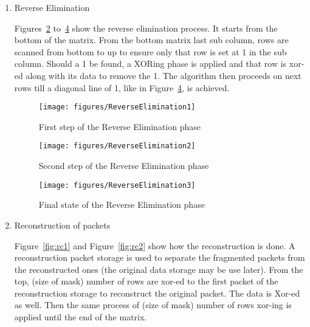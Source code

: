 \documentclass[a4paper,twoside]{article}
\begin{document}
\begin{enumerate}
These Swap phase and the XORing phase are repeated for each row from top to bottom until a triangle of 1 is achieved in Figure~\ref{fig:fs3}.

\begin{figure}[!hbt]
\centering
\texttt{[image: figures/ForwardSubstitution3]}
\caption{Final state of Forward Substitution phase}
\label{fig:fs3}
\end{figure}

\item Reverse Elimination

Figures~\ref{fig:re1} to~\ref{fig:re3} show the reverse elimination process. It starts from the bottom of the matrix. From the bottom matrix last sub column, rows are scanned from bottom to up to ensure only that row is set at 1 in the sub column. Should a 1 be found, a XORing phase is applied and that row is xor-ed along with its data to remove the 1. The algorithm then proceeds on next rows till a diagonal line of 1, like in Figure~\ref{fig:re3}, is achieved.

\begin{figure}[!hbt]
\centering
\texttt{[image: figures/ReverseElimination1]}
\caption{First step of the Reverse Elimination phase}
\label{fig:re1}
\end{figure}

\begin{figure}[!hbt]
\centering
\texttt{[image: figures/ReverseElimination2]}
\caption{Second step of the Reverse Elimination phase}
\label{fig:re2}
\end{figure}

\begin{figure}[!hbt]
\centering
\texttt{[image: figures/ReverseElimination3]}
\caption{Final state of the Reverse Elimination phase}
\label{fig:re3}
\end{figure}

\newpage

\item Reconstruction of packets

Figure~\ref{fig:rc1} and Figure~\ref{fig:rc2} show how the reconstruction is done. A reconstruction packet storage is used to separate the fragmented packets from the reconstructed ones (the original data storage may be use later). From the top, (size of mask) number of rows are xor-ed to the first packet of the reconstruction storage to reconstruct the original packet. The data is Xor-ed as well. Then the same process of (size of mask) number of rows xor-ing is applied until the end of the matrix.


\end{enumerate}
\end{document}
